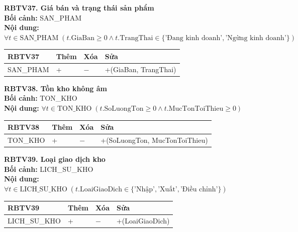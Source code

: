 \documentclass[11pt, a4paper]{article}
\begin{document}
\vspace{0.8em}
\textbf{RBTV37. Giá bán và trạng thái sản phẩm} \\
\textbf{Bối cảnh:} SAN\_PHAM \\
\textbf{Nội dung:} $\forall t \in \text{SAN\_PHAM} \; (t.\text{GiaBan} \ge 0 \land t.\text{TrangThai} \in \{\text{'Đang kinh doanh'}, \text{'Ngừng kinh doanh'}\})$

\vspace{0.3em}
\begin{small}
\begin{tabularx}{\textwidth}{| C{4.2cm} | C{2cm} | C{2cm} | Y |}
\hline
\textbf{RBTV37} & \textbf{Thêm} & \textbf{Xóa} & \textbf{Sửa} \\
\hline
SAN\_PHAM & + & $-$ & +(GiaBan, TrangThai) \\
\hline
\end{tabularx}
\end{small}

\vspace{0.8em}
\textbf{RBTV38. Tồn kho không âm} \\
\textbf{Bối cảnh:} TON\_KHO \\
\textbf{Nội dung:} $\forall t \in \text{TON\_KHO} \; (t.\text{SoLuongTon} \ge 0 \land t.\text{MucTonToiThieu} \ge 0)$

\vspace{0.3em}
\begin{small}
\begin{tabularx}{\textwidth}{| C{4.2cm} | C{2cm} | C{2cm} | Y |}
\hline
\textbf{RBTV38} & \textbf{Thêm} & \textbf{Xóa} & \textbf{Sửa} \\
\hline
TON\_KHO & + & $-$ & +(SoLuongTon, MucTonToiThieu) \\
\hline
\end{tabularx}
\end{small}

\vspace{0.8em}
\textbf{RBTV39. Loại giao dịch kho} \\
\textbf{Bối cảnh:} LICH\_SU\_KHO \\
\textbf{Nội dung:} $\forall t \in \text{LICH\_SU\_KHO} \; (t.\text{LoaiGiaoDich} \in \{\text{'Nhập'}, \text{'Xuất'}, \text{'Điều chỉnh'}\})$

\vspace{0.3em}
\begin{small}
\begin{tabularx}{\textwidth}{| C{4.2cm} | C{2cm} | C{2cm} | Y |}
\hline
\textbf{RBTV39} & \textbf{Thêm} & \textbf{Xóa} & \textbf{Sửa} \\
\hline
LICH\_SU\_KHO & + & $-$ & +(LoaiGiaoDich) \\
\hline
\end{tabularx}
\end{small}
\end{document}
